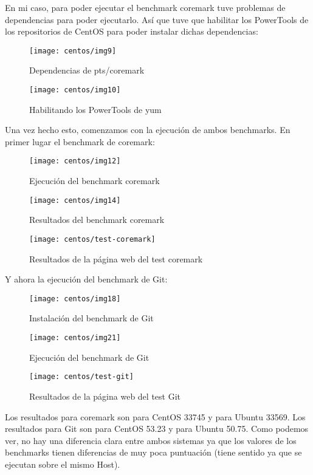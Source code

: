 En mi caso, para poder ejecutar el benchmark coremark tuve problemas de dependencias para poder ejecutarlo. Así que tuve que habilitar los PowerTools de los repositorios de CentOS para poder instalar dichas dependencias:

\begin{figure}[H]
    \centering
    \texttt{[image: centos/img9]}
    \caption{Dependencias de pts/coremark}
\end{figure}

\begin{figure}[H]
    \centering
    \texttt{[image: centos/img10]}
    \caption{Habilitando los PowerTools de yum}
\end{figure}

\newpage
Una vez hecho esto, comenzamos con la ejecución de ambos benchmarks. En primer lugar el benchmark de coremark:

\begin{figure}[H]
    \centering
    \texttt{[image: centos/img12]}
    \caption{Ejecución del benchmark coremark}
\end{figure}

\begin{figure}[H]
    \centering
    \texttt{[image: centos/img14]}
    \caption{Resultados del benchmark coremark}
\end{figure}

\begin{figure}[H]
    \centering
    \texttt{[image: centos/test-coremark]}
    \caption{Resultados de la página web del test coremark}
\end{figure}

\newpage
Y ahora la ejecución del benchmark de Git:

\begin{figure}[H]
    \centering
    \texttt{[image: centos/img18]}
    \caption{Instalación del benchmark de Git}
\end{figure}

\begin{figure}[H]
    \centering
    \texttt{[image: centos/img21]}
    \caption{Ejecución del benchmark de Git}
\end{figure}

\begin{figure}[H]
    \centering
    \texttt{[image: centos/test-git]}
    \caption{Resultados de la página web del test Git}
\end{figure}

Los resultados para coremark son para CentOS 33745 y para Ubuntu 33569.
Los resultados para Git son para CentOS 53.23 y para Ubuntu 50.75.
Como podemos ver, no hay una diferencia clara entre ambos sistemas ya que los valores de los benchmarks tienen diferencias de muy poca puntuación (tiene sentido ya que se ejecutan sobre el mismo Host).












